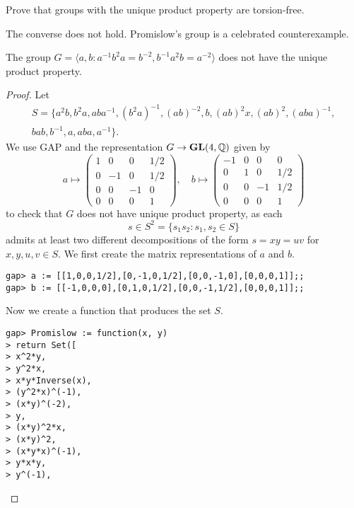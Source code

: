 \begin{exercise}
	Prove that groups with the unique product property are
	torsion-free.
\end{exercise}

The converse does not hold. 
Promislow's group is a celebrated counterexample.

\begin{theorem}[Promislow]
    The group $G=\langle a,b:a^{-1}b^2a=b^{-2},b^{-1}a^2b=a^{-2}\rangle$
    does not have the unique product property.
\end{theorem}

\begin{proof}
    Let 
    \begin{multline}
    \label{eq:Promislow}
    S=\{ a^2b,
    b^2a,
    aba^{-1},
    (b^2a)^{-1},
    (ab)^{-2},
    b,
    (ab)^2x,
    (ab)^2,
    (aba)^{-1},\\
    bab,
    b^{-1},
    a,
    aba,
    a^{-1}
    \}.
    \end{multline}
    We use \textsf{GAP} and the representation $G\to\mathbf{GL}(4,\mathbb{Q})$ given by 
    \[
a\mapsto\begin{pmatrix}
1 & 0 & 0 & 1/2\\
0 & -1 & 0 & 1/2\\
0 & 0 & -1 & 0\\
0 & 0 & 0 & 1
\end{pmatrix},
\quad
b\mapsto\begin{pmatrix}
-1 & 0 & 0 & 0\\
0 & 1 & 0 & 1/2\\
0 & 0 & -1 & 1/2\\
0 & 0 & 0 & 1
\end{pmatrix}
\]
    to check that 
    $G$ does not have
    unique product property, as each 
    \[
    s\in S^2=\{s_1s_2:s_1,s_2\in S\}
    \]
    admits at least two different decompositions of the 
    form $s=xy=uv$ for $x,y,u,v\in S$. 
    We first create the matrix representations of $a$ and $b$.
\begin{lstlisting}
gap> a := [[1,0,0,1/2],[0,-1,0,1/2],[0,0,-1,0],[0,0,0,1]];;
gap> b := [[-1,0,0,0],[0,1,0,1/2],[0,0,-1,1/2],[0,0,0,1]];;
\end{lstlisting}
    Now we create
    a function that produces the set $S$.
\begin{lstlisting}
gap> Promislow := function(x, y)
> return Set([
> x^2*y,
> y^2*x,
> x*y*Inverse(x),
> (y^2*x)^(-1),
> (x*y)^(-2),
> y,
> (x*y)^2*x,
> (x*y)^2,
> (x*y*x)^(-1),
> y*x*y,
> y^(-1),

\end{lstlisting}
\end{proof}

